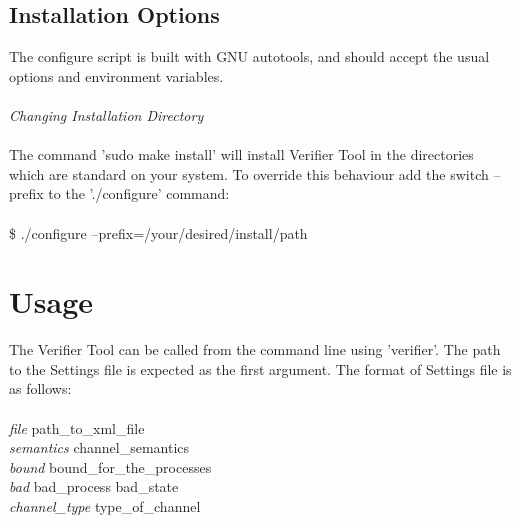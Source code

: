 \documentclass[a4paper]{article}
\begin{document}
\subsection{Installation Options}


The configure script is built with GNU autotools, and should accept the usual
options and environment variables.
\\
\\
\emph{Changing Installation Directory} 
\\
\\
The command ’sudo make install’ will install Verifier Tool in the directories which are standard on your system. To override this behaviour add the switch
--prefix to the ’./configure’ command:
\\
\\
\hspace*{5mm}\$ ./configure --prefix=/your/desired/install/path

\section{Usage}
The Verifier Tool can be called from the command line using 'verifier'. The path to the Settings file is expected as the first argument. The format of Settings file is as follows:
\\
\\
\hspace*{15mm}\emph{file} \hspace*{20mm}     path\_to\_xml\_file
\\
\hspace*{15mm}\emph{semantics} \hspace*{9mm}    channel\_semantics
\\
\hspace*{15mm}\emph{bound} \hspace*{15mm} bound\_for\_the\_processes
\\
\hspace*{15mm}\emph{bad}   \hspace*{19mm}   bad\_process   bad\_state
\\
\hspace*{15mm}\emph{channel\_type}  \hspace*{5mm}   type\_of\_channel
\end{document}
